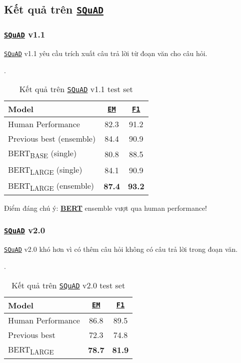 \subsection{Kết quả trên \hyperref[acro:squad]{\texttt{SQuAD}}}
\label{ssec:ket_qua_squad}

\subsubsection{\hyperref[acro:squad]{\texttt{SQuAD}} v1.1}
\hyperref[acro:squad]{\texttt{SQuAD}} v1.1 yêu
cầu trích xuất câu trả lời từ đoạn văn cho câu hỏi.
\begin{table}[H]
    \centering
    \caption{Kết quả trên \hyperref[acro:squad]{\texttt{SQuAD}} v1.1 test set \cite{devlin2018bert}}.
    \label{tab:squad_v1_results}
    \begin{tabular}{lcc}
        \toprule
        \textbf{Model} & \textbf{\hyperref[acro:em]{\texttt{EM}}} & \textbf{\hyperref[acro:f1]{\texttt{F1}}} \\
        \midrule
        Human Performance & 82.3 & 91.2 \\
        Previous best (ensemble) & 84.4 & 90.9 \\
        \midrule
        BERT\textsubscript{BASE} (single) & 80.8
        & 88.5 \\
        BERT\textsubscript{LARGE} (single) & 84.1 & 90.9 \\
        BERT\textsubscript{LARGE} (ensemble) & \textbf{87.4} & \textbf{93.2} \\
        \bottomrule
    \end{tabular}
\end{table}

Điểm đáng chú ý: \hyperref[acro:bert]{\textbf{BERT}} ensemble vượt qua human performance!
\subsubsection{\hyperref[acro:squad]{\texttt{SQuAD}} v2.0}
\hyperref[acro:squad]{\texttt{SQuAD}} v2.0 khó hơn vì có thêm câu hỏi không có câu trả lời trong đoạn văn.
\begin{table}[H]
    \centering
    \caption{Kết quả trên \hyperref[acro:squad]{\texttt{SQuAD}} v2.0 test set \cite{devlin2018bert}}.
    \label{tab:squad_v2_results}
    \begin{tabular}{lcc}
        \toprule
        \textbf{Model} & \textbf{\hyperref[acro:em]{\texttt{EM}}} & \textbf{\hyperref[acro:f1]{\texttt{F1}}} \\
        \midrule
        Human Performance & 86.8 & 89.5 \\
        Previous best & 72.3 & 74.8 \\
        \midrule
        BERT\textsubscript{LARGE} & \textbf{78.7} & \textbf{81.9}
        \\
        \bottomrule
    \end{tabular}
\end{table}

